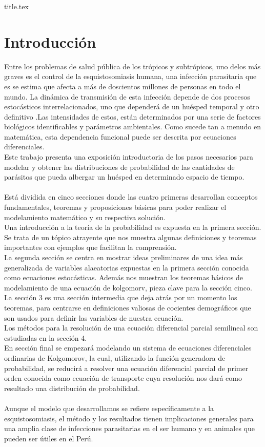 \documentclass[a4paper,11pt]{book}
\begin{document}
\frontmatter
{title.tex}

\clearpage
\thispagestyle{empty}

\tableofcontents

\mainmatter

\chapter*{Introducción}
Entre los problemas de salud pública de los trópicos y subtrópicos, uno delos más graves es el control de la esquistosomiasis humana, una infección parasitaria que es se estima que afecta a más de doscientos millones de personas en todo el mundo. 
La dinámica de transmisión de esta infección depende de dos procesos estocásticos interrelacionados, uno que dependerá de un huésped temporal y otro definitivo .Las intensidades de estos, están determinados por una serie de factores biológicos identificables y parámetros ambientales. Como sucede tan a menudo en matemática, esta dependencia funcional puede ser descrita por ecuaciones diferenciales.\\ 
Este trabajo presenta una exposición introductoria de los pasos necesarios para modelar y obtener las distribuciones de probabilidad de las cantidades de parásitos que pueda albergar un huésped en determinado espacio de tiempo.\\ \\
Está dividida en cinco secciones donde las cuatro primeras desarrollan conceptos fundamentales, teoremas y proposiciones básicas para poder realizar el modelamiento matemático y su respectiva solución.\\
Una introducción a la teoría de la probabilidad es expuesta en la primera sección. Se trata de un tópico atrayente que nos muestra algunas definiciones y teoremas importantes con ejemplos que facilitan la comprensión.\\
La segunda sección se centra en mostrar ideas preliminares de una idea más generalizada de variables alaeatorias expuestas en la primera sección conocida como ecuaciones estocásticas. Además nos muestran los teoremas básicos de modelamiento de una ecuación de kolgomorv, pieza clave para la sección cinco.\\
La sección 3 es una sección intermedia que deja atrás por un momento los teoremas, para centrarse en definiciones valiosas de cocientes demográficos que son usados para definir las variables de nuestra ecuación.\\
Los métodos para la resolución de una ecuación diferencial parcial semilineal son estudiadas en la sección 4.\\
En sección final se empezará modelando un sistema de ecuaciones diferenciales ordinarias de Kolgomorov, la cual, utilizando la función generadora de probabilidad, se reducirá a resolver una ecuación diferencial parcial de primer orden conocida como ecuación de transporte cuya resolución nos dará como resultado una distribución de probabilidad.\\ \\
Aunque el modelo que desarrollamos se refiere específicamente a la esquistosomiasis, el método y los resultados tienen implicaciones generales para una amplia clase de infecciones parasitarias en el ser humano y en animales que pueden ser útiles en el Perú.
\end{document}

